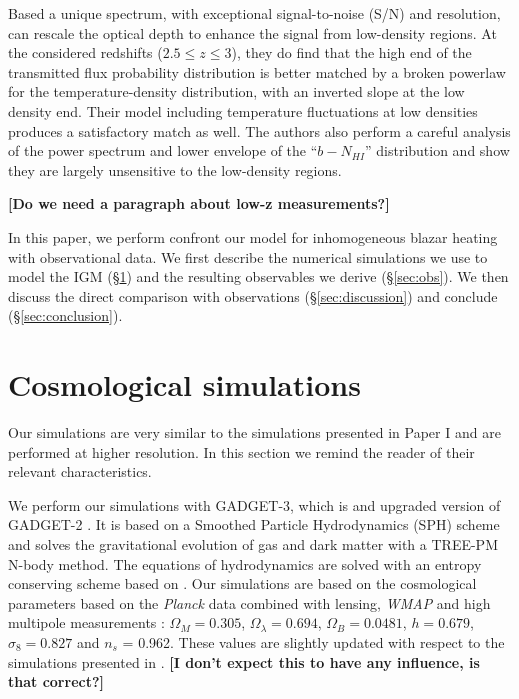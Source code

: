 \documentclass[numberedappendix]{emulateapj}
\newcommand\ALc[1]{{\color{red} \bf #1}} %
\begin{document}
 Based a unique spectrum, with exceptional signal-to-noise  (S/N) and resolution, \citet{2017MNRAS.466.2690R} can rescale the optical depth to enhance the signal from low-density regions. At the considered redshifts ($2.5\leq z \leq 3$), they do find that the 
high end of the transmitted flux probability distribution is better matched by a broken powerlaw for the temperature-density distribution, with an inverted slope at the low density end. Their model including temperature fluctuations at low densities produces a satisfactory match as well. The authors also perform a careful analysis of the power spectrum and lower envelope of the ``$b-N_{HI}$'' distribution and show they are largely  unsensitive to the low-density regions. 

\ALc{[Do we need a paragraph about low-z measurements?]}

In this paper, we perform confront our model for inhomogeneous blazar heating with observational data. We first describe the numerical simulations we use to model the IGM (\S\ref{sec:sims}) and the resulting observables we derive (\S\ref{sec:obs}). We then discuss the direct comparison with observations (\S\ref{sec:discussion}) and conclude (\S\ref{sec:conclusion}).



\section{Cosmological simulations}\label{sec:sims}

Our simulations are very similar to the simulations presented in Paper I and are performed at higher resolution. In this section we remind the reader of their relevant characteristics. 

We perform our simulations with \textsc{GADGET-3}, which is and upgraded version of \textsc{GADGET-2} \citep{2005MNRAS.364.1105S}.  It is based on a Smoothed Particle Hydrodynamics (SPH) scheme and solves the gravitational evolution of gas and dark matter with a TREE-PM N-body method.  The equations of hydrodynamics are solved with an entropy conserving scheme based on \citep{2002MNRAS.333..649S}.   Our simulations are based on the cosmological parameters based on  the \textit{Planck} data combined with lensing, \textit{WMAP} and high multipole measurements \citep{2014A&A...571A..16P}: $\Omega_M = 0.305$, $\Omega_{\lambda} = 0.694$, $\Omega_B = 0.0481$, $h = 0.679$, $\sigma_8 = 0.827$ and $n_s$ = 0.962.  These values are slightly updated with respect to the simulations presented in \citep{2012MNRAS.423..149P,2015ApJ...811...19L}. \ALc{[I don't expect this to have any influence, is that correct?]}
\end{document}
